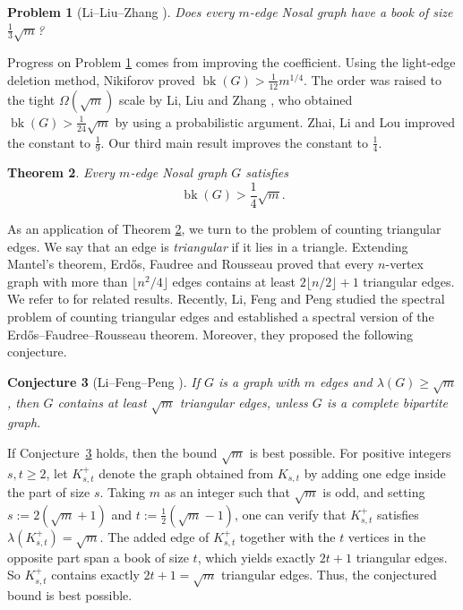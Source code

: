 \documentclass[10pt,a4paper]{amsart}
\newtheorem{theorem}{Theorem}[section]
\newtheorem{conjecture}[theorem]{Conjecture}
\newtheorem{problem}[theorem]{Problem}
\newcommand{\bk}{\operatorname{bk}}
\renewcommand{\ge}{\geqslant}
\begin{document}
\begin{problem}[Li--Liu--Zhang \cite{LiLiuZhang26}] \label{prob-bk-13}
Does every $m$-edge Nosal graph have a book of size $\frac{1}{3}\sqrt{m}$? 
\end{problem}

Progress on Problem \ref{prob-bk-13} 
comes from improving the coefficient. 
Using the light-edge deletion method, 
Nikiforov \cite{Nikiforov21} proved $\bk(G)>\frac1{12}m^{1/4}$. 
The order was raised to the tight 
$\Omega (\sqrt{m})$ scale by Li, Liu and Zhang \cite{LiLiuZhang26}, who obtained   $\bk(G)>\frac1{24}\sqrt{m}$ by using a probabilistic argument. 
Zhai, Li and Lou \cite{ZhaiLiLou26} improved the constant to $\frac19$.  
Our third main result improves the constant to $\frac{1}{4}$. 

\begin{theorem} \label{thm-size-14}
Every $m$-edge Nosal graph $G$ satisfies
$$ \bk(G)>\frac14\sqrt{m}. $$
\end{theorem}


As an application of Theorem \ref{thm-size-14}, 
we turn to the problem of counting  triangular edges. 
We say that an edge is \emph{triangular} if it lies in a triangle.
Extending Mantel's theorem, Erd\H{o}s, Faudree and Rousseau \cite{EFR1992}
proved that every $n$-vertex graph with more than $\lfloor n^2/4\rfloor$ edges
contains at least $2\lfloor n/2\rfloor +1$ triangular edges. We refer to \cite{FM2017, GL2018, GHV2019} for related results. 
Recently, Li, Feng and Peng \cite{LFP2024-triangular} studied the spectral 
problem of counting triangular edges and established a spectral version of
the Erd\H{o}s--Faudree--Rousseau theorem. Moreover, they proposed the
following conjecture.

\begin{conjecture}[Li--Feng--Peng \cite{LFP2024-triangular}]
\label{thm-main2}
If $G$ is a graph with $m$ edges and $\lambda (G)\ge \sqrt{m}$, then $G$ contains at least $\sqrt{m}$ triangular edges, unless $G$ is a complete bipartite graph. 
\end{conjecture}

If Conjecture~\ref{thm-main2} holds, then the bound $\sqrt{m}$ is best
possible. 
For positive integers $s,t\ge 2$, 
let $K_{s,t}^{+}$ denote the
graph obtained from $K_{s,t}$ by adding one
edge inside the part of size $s$. Taking $m$ as an integer such that $\sqrt{m}$ is odd, and setting  $s:=2(\sqrt{m}+1)$ and $t:=\tfrac{1}{2}(\sqrt{m}-1)$, one can verify that $K_{s,t}^+$ satisfies $\lambda (K_{s,t}^+) = \sqrt{m}$. 
The added edge of $K_{s,t}^+$  
together with the $t$ vertices in the opposite
part span a book of size $t$, which   
yields exactly $2t+1$ triangular edges. So $K_{s,t}^+$ contains exactly $2t+1=\sqrt{m}$ triangular edges. Thus, the conjectured bound is best possible. 
\end{document}
